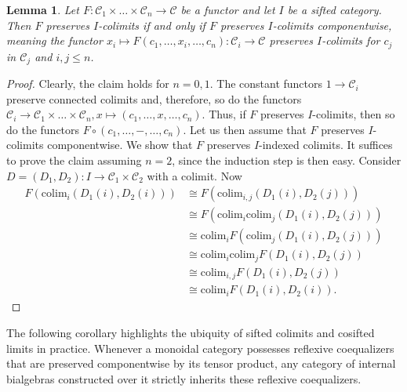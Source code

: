\documentclass[11pt]{article}
\theoremstyle{plain}
\newtheorem{lemma}[theorem]{Lemma}
\theoremstyle{definition}
\numberwithin{equation}{section}
\newcommand{\C}{\mathcal{C}}
\newcommand{\colim}{\mathrm{colim}}
\begin{document}
\begin{lemma}\label{lem:SiftedTotalityFromComponents}
   Let $F\colon \C_1\times\ldots\times \C_n\to \C$ be a functor and let $I$ be a sifted category. Then $F$ preserves $I$-colimits if and only if $F$ preserves $I$-colimits componentwise, meaning the functor $x_i\mapsto F(c_1,\ldots, x_i,\ldots,c_n)\colon \C_i\to \C$ preserves $I$-colimits for  $c_j$ in $\C_j$ and $i,j\leq n$. 
\end{lemma}
\begin{proof}
   Clearly, the claim holds for $n = 0,1$. The constant functors $1\to \C_i$ preserve connected colimits and, therefore, so do the functors $\C_i\to \C_1\times \ldots \times \C_n,x\mapsto (c_1,\ldots, x,\ldots, c_n)$. Thus, if $F$ preserves $I$-colimits, then so do the functors $F\circ (c_1,\ldots, -,\ldots, c_n)$. Let us then assume that $F$ preserves $I$-colimits componentwise. We show that $F$ preserves $I$-indexed colimits. It suffices to prove the claim assuming $n = 2$, since the induction step is then easy. Consider $D = (D_1,D_2)\colon I\to \C_1\times \C_2$ with a colimit. Now 
   \begin{align*}
       F(\colim_i (D_1(i), D_2(i)))
       &\cong F(\colim_{i,j}(D_1(i),D_2(j)))\tag{$\Delta$ is final}\\
       &\cong F(\colim_i \colim_j(D_1(i),D_2(j)))\tag{Fubini}\\
       &\cong \colim_i F(\colim_j(D_1(i),D_2(j)))\tag{Preservation componentwise}\\
       &\cong \colim_i\colim_j F(D_1(i),D_2(j))\tag{Preservation componentwise}\\
       &\cong \colim_{i,j} F(D_1(i),D_2(j))\tag{Fubini}\\
       &\cong \colim_i F(D_1(i),D_2(i)).\tag{$\Delta$ is final}
   \end{align*}
\end{proof}

The following corollary highlights the ubiquity of sifted colimits and cosifted limits in practice. Whenever a monoidal category possesses reflexive coequalizers that are preserved componentwise by its tensor product, any category of internal bialgebras constructed over it strictly inherits these reflexive coequalizers.
\end{document}
